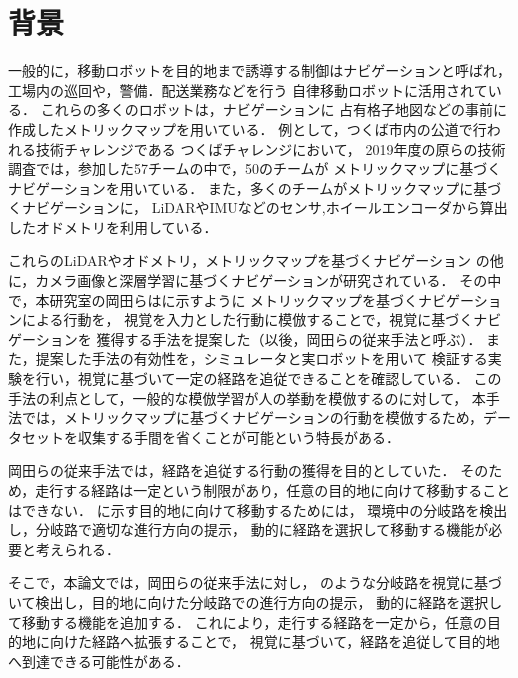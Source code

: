 
\section{背景}
一般的に，移動ロボットを目的地まで誘導する制御はナビゲーションと呼ばれ，工場内の巡回や，警備．配送業務などを行う
自律移動ロボットに活用されている．
これらの多くのロボットは，ナビゲーションに
占有格子地図などの事前に作成したメトリックマップを用いている．
例として，つくば市内の公道で行われる技術チャレンジである
つくばチャレンジにおいて，
2019年度の原らの技術調査\cite{hara2019}では，参加した57チームの中で，50のチームが
メトリックマップに基づくナビゲーションを用いている．
また，多くのチームがメトリックマップに基づくナビゲーションに，
LiDARやIMUなどのセンサ,ホイールエンコーダから算出したオドメトリを利用している．

これらのLiDARやオドメトリ，メトリックマップを基づくナビゲーション
の他に，カメラ画像と深層学習に基づくナビゲーションが研究\cite{kendall2018learning}\cite{sauer2018conditional}されている．
その中で，本研究室の岡田ら\cite{okada2020}\cite{okada2021}はに示すように
メトリックマップを基づくナビゲーションによる行動を，
視覚を入力とした行動に模倣することで，視覚に基づくナビゲーションを
獲得する手法を提案した（以後，岡田らの従来手法と呼ぶ）．
また，提案した手法の有効性を，シミュレータと実ロボットを用いて
検証する実験を行い，視覚に基づいて一定の経路を追従できることを確認している．
この手法の利点として，一般的な模倣学習が人の挙動を模倣するのに対して，
本手法では，メトリックマップに基づくナビゲーションの行動を模倣するため，データセットを収集する手間を省くことが可能という特長がある．

岡田らの従来手法では，経路を追従する行動の獲得を目的としていた．
そのため，走行する経路は一定という制限があり，任意の目的地に向けて移動することはできない．
に示す目的地に向けて移動するためには，
環境中の分岐路を検出し，分岐路で適切な進行方向の提示，
動的に経路を選択して移動する機能が必要と考えられる．

そこで，本論文では，岡田らの従来手法に対し，
のような分岐路を視覚に基づいて検出し，目的地に向けた分岐路での進行方向の提示，
動的に経路を選択して移動する機能を追加する．
これにより，走行する経路を一定から，任意の目的地に向けた経路へ拡張することで，
視覚に基づいて，経路を追従して目的地へ到達できる可能性がある．

